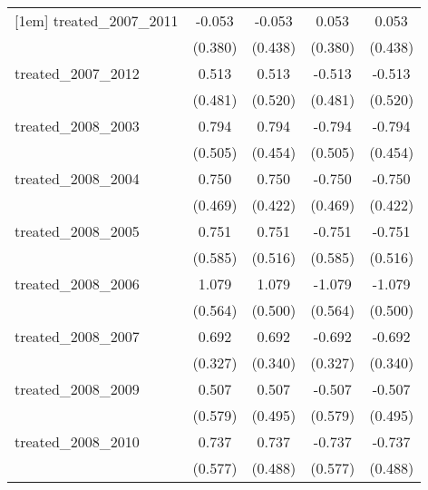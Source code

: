 {\begin{tabular}{l*{4}{c}}
[1em]
treated\_2007\_2011&      -0.053         &      -0.053         &       0.053         &       0.053         \\
            &     (0.380)         &     (0.438)         &     (0.380)         &     (0.438)         \\
[1em]
treated\_2007\_2012&       0.513         &       0.513         &      -0.513         &      -0.513         \\
            &     (0.481)         &     (0.520)         &     (0.481)         &     (0.520)         \\
[1em]
treated\_2008\_2003&       0.794         &       0.794         &      -0.794         &      -0.794         \\
            &     (0.505)         &     (0.454)         &     (0.505)         &     (0.454)         \\
[1em]
treated\_2008\_2004&       0.750         &       0.750         &      -0.750         &      -0.750         \\
            &     (0.469)         &     (0.422)         &     (0.469)         &     (0.422)         \\
[1em]
treated\_2008\_2005&       0.751         &       0.751         &      -0.751         &      -0.751         \\
            &     (0.585)         &     (0.516)         &     (0.585)         &     (0.516)         \\
[1em]
treated\_2008\_2006&       1.079         &       1.079\sym{*}  &      -1.079         &      -1.079\sym{*}  \\
            &     (0.564)         &     (0.500)         &     (0.564)         &     (0.500)         \\
[1em]
treated\_2008\_2007&       0.692\sym{*}  &       0.692\sym{*}  &      -0.692\sym{*}  &      -0.692\sym{*}  \\
            &     (0.327)         &     (0.340)         &     (0.327)         &     (0.340)         \\
[1em]
treated\_2008\_2009&       0.507         &       0.507         &      -0.507         &      -0.507         \\
            &     (0.579)         &     (0.495)         &     (0.579)         &     (0.495)         \\
[1em]
treated\_2008\_2010&       0.737         &       0.737         &      -0.737         &      -0.737         \\
            &     (0.577)         &     (0.488)         &     (0.577)         &     (0.488)         \\

\end{tabular}}
